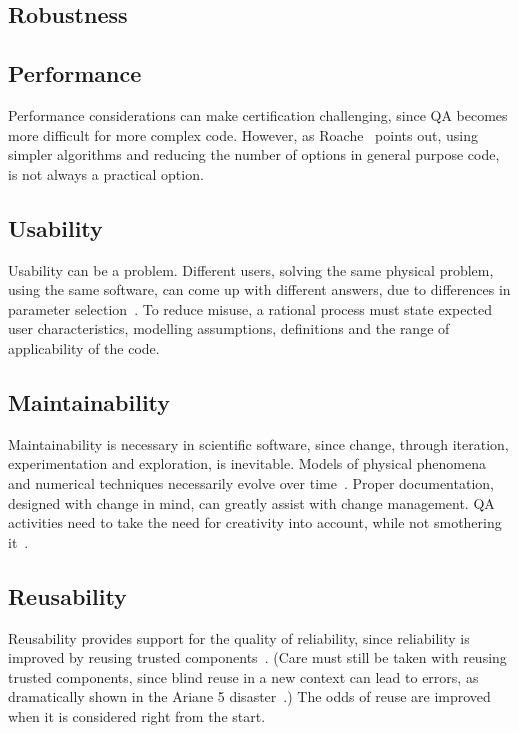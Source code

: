 \documentclass[12pt]{article}
\begin{document}
\subsection{Robustness}

\subsection{Performance}

Performance considerations can make certification challenging, since QA becomes
more difficult for more complex code.  However, as
Roache~\cite[p.~355]{Roache1998} points out, using simpler algorithms and
reducing the number of options in general purpose code, is not always a
practical option.

\subsection{Usability}

Usability can be a problem.  Different users, solving the same physical problem,
using the same software, can come up with different answers, due to differences
in parameter selection~\cite[p.~370]{Roache1998}.  To reduce misuse, a rational
process must state expected user characteristics, modelling assumptions,
definitions and the range of applicability of the code.

\subsection{Maintainability}

Maintainability is necessary in scientific software, since change, through
iteration, experimentation and exploration, is inevitable.  Models of physical
phenomena and numerical techniques necessarily evolve over
time~\cite{CarverEtAl2007, SegalAndMorris2008}.  Proper documentation, designed
with change in mind, can greatly assist with change management.  QA activities
need to take the need for creativity into account, while not smothering
it~\cite[p.~352]{Roache1998}.

\subsection{Reusability}

Reusability provides support for the quality of reliability, since reliability
is improved by reusing trusted components~\cite{Dubois2005}.  (Care must still
be taken with reusing trusted components, since blind reuse in a new context can
lead to errors, as dramatically shown in the Ariane 5
disaster~\cite[p.~37--38]{OliveiraAndStewart2006}.)  The odds of reuse are
improved when it is considered right from the start.
\end{document}
